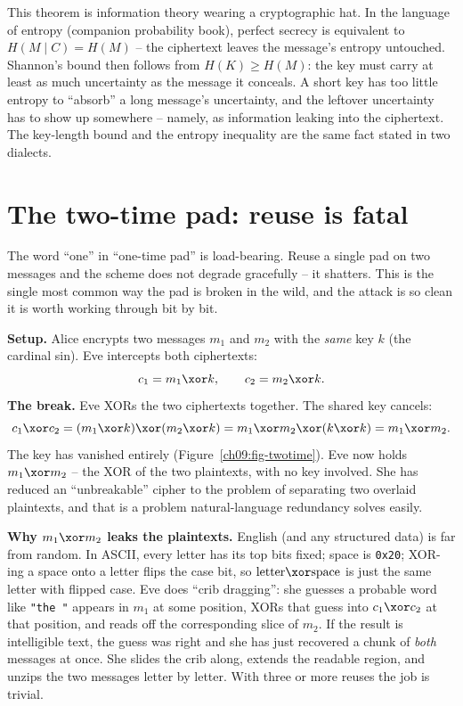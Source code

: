 \begin{connectionbox}
This theorem is information theory wearing a cryptographic hat. In the language of entropy (companion probability book), perfect secrecy is equivalent to $H(M \mid C) = H(M)$ -- the ciphertext leaves the message's entropy untouched. Shannon's bound then follows from $H(K) \ge H(M)$: the key must carry at least as much uncertainty as the message it conceals. A short key has too little entropy to ``absorb'' a long message's uncertainty, and the leftover uncertainty has to show up somewhere -- namely, as information leaking into the ciphertext. The key-length bound and the entropy inequality are the same fact stated in two dialects.
\end{connectionbox}

\section{The two-time pad: reuse is fatal}
\label{ch09:two-time}

The word ``one'' in ``one-time pad'' is load-bearing. Reuse a single pad on two messages and the scheme does not degrade gracefully -- it shatters. This is the single most common way the pad is broken in the wild, and the attack is so clean it is worth working through bit by bit.

\begin{attackbox}
\textbf{Setup.} Alice encrypts two messages $m_1$ and $m_2$ with the \emph{same} key $k$ (the cardinal sin). Eve intercepts both ciphertexts:
\[
  c_1 = m_1 \xor k, \qquad c_2 = m_2 \xor k.
\]
\textbf{The break.} Eve XORs the two ciphertexts together. The shared key cancels:
\[
  c_1 \xor c_2 = (m_1 \xor k) \xor (m_2 \xor k) = m_1 \xor m_2 \xor (k \xor k) = m_1 \xor m_2.
\]
The key has vanished entirely (Figure~\ref{ch09:fig-twotime}). Eve now holds $m_1 \xor m_2$ -- the XOR of the two plaintexts, with no key involved. She has reduced an ``unbreakable'' cipher to the problem of separating two overlaid plaintexts, and that is a problem natural-language redundancy solves easily.

\textbf{Why $m_1 \xor m_2$ leaks the plaintexts.} English (and any structured data) is far from random. In ASCII, every letter has its top bits fixed; space is \texttt{0x20}; XOR-ing a space onto a letter flips the case bit, so $\text{letter} \xor \text{space}$ is just the same letter with flipped case. Eve does ``crib dragging'': she guesses a probable word like \texttt{"the~"} appears in $m_1$ at some position, XORs that guess into $c_1\xor c_2$ at that position, and reads off the corresponding slice of $m_2$. If the result is intelligible text, the guess was right and she has just recovered a chunk of \emph{both} messages at once. She slides the crib along, extends the readable region, and unzips the two messages letter by letter. With three or more reuses the job is trivial.
\end{attackbox}

